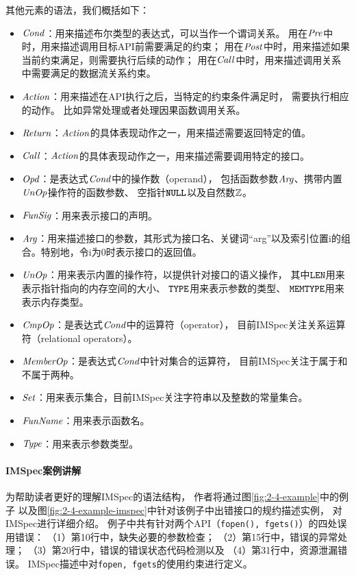 

其他元素的语法，我们概括如下：
\begin{itemize}
	\item $\mathit{Cond}$：用来描述布尔类型的表达式，可以当作一个谓词关系。
	用在$\mathit{Pre}$中时，用来描述调用目标API前需要满足的约束；
	用在$\mathit{Post}$中时，用来描述如果当前约束满足，则需要执行后续的动作；
	用在$\mathit{Call}$中时，用来描述调用关系中需要满足的数据流关系约束。
	\item $\mathit{Action}$：用来描述在API执行之后，当特定的约束条件满足时，
	需要执行相应的动作。
	比如异常处理或者处理因果函数调用关系。
	\item $\mathit{Return}$：$\mathit{Action}$的具体表现动作之一，用来描述需要返回特定的值。
	\item $\mathit{Call}$：$\mathit{Action}$的具体表现动作之一，用来描述需要调用特定的接口。
	\item $\mathit{Opd}$：是表达式$\mathit{Cond}$中的操作数（operand），
	包括函数参数$\mathit{Arg}$、携带内置$\mathit{UnOp}$操作符的函数参数、
	空指针$\texttt{\textbf{NULL}}$以及自然数$\mathbb{Z}$。
	\item $\mathit{FunSig}$：用来表示接口的声明。
	\item $\mathit{Arg}$：用来描述接口的参数，其形式为接口名、关键词“arg”以及索引位置i的组合。特别地，令i为0时表示接口的返回值。
	\item $\mathit{UnOp}$：用来表示内置的操作符，以提供针对接口的语义操作，
	其中\textbf{$\texttt{LEN}$}用来表示指针指向的内存空间的大小、
	\textbf{$\texttt{TYPE}$}用来表示参数的类型、
	\textbf{$\texttt{MEMTYPE}$}用来表示内存类型。
	\item $\mathit{CmpOp}$：是表达式$\mathit{Cond}$中的运算符（operator），
	目前IMSpec关注关系运算符（relational operators）。
	\item $\mathit{MemberOp}$：是表达式$\mathit{Cond}$中针对集合的运算符，
	目前IMSpec关注于属于和不属于两种。
	\item $\mathit{Set}$：用来表示集合，目前IMSpec关注字符串以及整数的常量集合。
	\item $\mathit{FunName}$：用来表示函数名。
	\item $\mathit{Type}$：用来表示参数类型。
\end{itemize}



\paragraph{IMSpec案例讲解}
为帮助读者更好的理解IMSpec的语法结构，
作者将通过图\ref{fig:2-4-example}中的例子
以及图\ref{fig:2-4-example-imspec}中针对该例子中出错接口的规约描述实例，
对IMSpec进行详细介绍。
例子中共有针对两个API（\texttt{fopen(), fgets()}）的四处误用错误：
（1）第10行中，缺失必要的参数检查；
（2）第15行中，错误的异常处理；
（3）第20行中，错误的错误状态代码检测以及
（4）第31行中，资源泄漏错误。
IMSpec描述中对\texttt{fopen, fgets}的使用约束进行定义。

